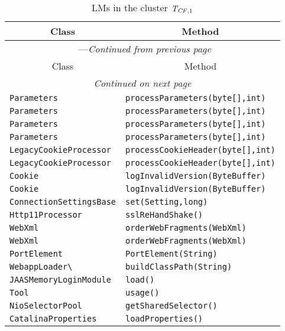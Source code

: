 \begin{center}
\begin{longtable}{ll}
\caption{LMs in the cluster $\mathit{T}_{\mathit{CF},1}$}\\
\toprule\multicolumn{1}{c}{Class}&\multicolumn{1}{c}{Method}\\\midrule
\endfirsthead

\multicolumn{2}{c}{\tablename\ \thetable{}---\textit{Continued from previous page}} \\\midrule
\multicolumn{1}{c}{Class}&\multicolumn{1}{c}{Method}\\\midrule
\endhead
\multicolumn{2}{c}{\textit{Continued on next page}}\\\midrule
\endfoot
\bottomrule
\endlastfoot

\lstinline/Parameters/&{\lstinline/processParameters(byte[],int)/}\\
\lstinline/Parameters/&{\lstinline/processParameters(byte[],int)/}\\
\lstinline/Parameters/&{\lstinline/processParameters(byte[],int)/}\\
\lstinline/Parameters/&{\lstinline/processParameters(byte[],int)/}\\
\lstinline/LegacyCookieProcessor/&{\lstinline/processCookieHeader(byte[],int)/}\\
\lstinline/LegacyCookieProcessor/&{\lstinline/processCookieHeader(byte[],int)/}\\
\lstinline/Cookie/&{\lstinline/logInvalidVersion(ByteBuffer)/}\\
\lstinline/Cookie/&{\lstinline/logInvalidVersion(ByteBuffer)/}\\
\lstinline/ConnectionSettingsBase/&{\lstinline/set(Setting,long)/}\\
\lstinline/Http11Processor/&{\lstinline/sslReHandShake()/}\\
\lstinline/WebXml/&{\lstinline/orderWebFragments(WebXml)/}\\
\lstinline/WebXml/&{\lstinline/orderWebFragments(WebXml)/}\\
\lstinline/PortElement/&{\lstinline/PortElement(String)/}\\
\lstinline/WebappLoader\/&{\lstinline/buildClassPath(String)/}\\
\lstinline/JAASMemoryLoginModule/&{\lstinline/load()/}\\
\lstinline/Tool/&{\lstinline/usage()/}\\
\lstinline/NioSelectorPool/&{\lstinline/getSharedSelector()/}\\
\lstinline/CatalinaProperties/&{\lstinline/loadProperties()/}\\

\end{longtable}
\end{center}
